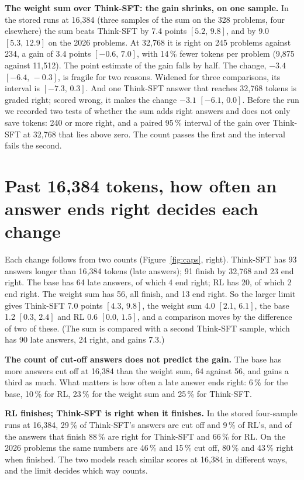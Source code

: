 \documentclass[10pt]{article}
\newcommand{\ci}[2]{$[#1,\,#2]$}
\begin{document}
\textbf{The weight sum over Think-SFT: the gain shrinks, on one sample.} In the stored runs at 16{,}384 (three
samples of the sum on the 328 problems, four elsewhere) the sum beats Think-SFT by 7.4 points \ci{5.2}{9.8}, and
by 9.0 \ci{5.3}{12.9} on the 2026 problems. At 32{,}768 it is right on 245 problems against 234, a gain of 3.4
points \ci{-0.6}{7.0}, with 14\,\% fewer tokens per problem (9{,}875 against 11{,}512). The point estimate of the
gain falls by half. The change, $-3.4$ \ci{-6.4}{-0.3}, is fragile for two reasons. Widened
for three comparisons, its interval is \ci{-7.3}{0.3}. And one Think-SFT answer that reaches 32{,}768 tokens is
graded right; scored wrong, it makes the change $-3.1$ \ci{-6.1}{0.0}. Before the run we recorded two tests of whether the sum adds
right answers and does not only save tokens: 240 or more right, and a paired 95\,\% interval of the gain over Think-SFT at 32{,}768 that lies above zero. The count
passes the first and the interval fails the second.

\section{Past 16{,}384 tokens, how often an answer ends right decides each change}

Each change follows from two counts (Figure~\ref{fig:caps}, right). Think-SFT has 93 answers longer than 16{,}384
tokens (late answers); 91 finish by 32{,}768 and 23 end right. The base has 64 late answers, of which 4 end right; RL has 20, of which 2
end right. The weight sum has 56, all finish, and 13 end right. So the larger limit gives Think-SFT 7.0 points \ci{4.3}{9.8},
the weight sum 4.0 \ci{2.1}{6.1}, the base 1.2 \ci{0.3}{2.4} and RL 0.6 \ci{0.0}{1.5}, and a comparison moves
by the difference of two of these. (The sum is compared with a second Think-SFT sample, which has 90 late
answers, 24 right, and gains 7.3.)

\textbf{The count of cut-off answers does not predict the gain.} The base has more answers cut off at 16{,}384
than the weight sum, 64 against 56, and gains a third as much. What matters is how often a late answer ends
right: 6\,\% for the base, 10\,\% for RL, 23\,\% for the weight sum and 25\,\% for Think-SFT.

\textbf{RL finishes; Think-SFT is right when it finishes.} In the stored four-sample runs at 16{,}384, 29\,\%
of Think-SFT's answers are cut off and 9\,\% of RL's, and of the answers that finish 88\,\% are right for
Think-SFT and 66\,\% for RL. On the 2026 problems the same numbers are 46\,\% and 15\,\% cut off, 80\,\% and
43\,\% right when finished. The two models reach similar scores at 16{,}384 in different ways, and the limit
decides which way counts.
\end{document}
